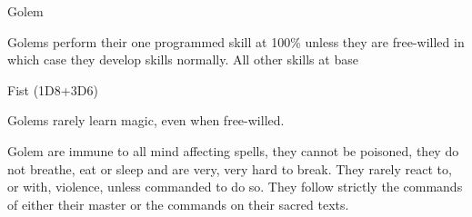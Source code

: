\begin{monsterbox}{Golem}
\begin{rpg-monsteraction}[Practical]
		Golems perform their one programmed skill at 100\% unless they are free-willed in which case they develop skills normally. All other skills at base %
	\end{rpg-monsteraction}
	\begin{rpg-monsteraction}
		Fist (1D8+3D6)
	\end{rpg-monsteraction}
	\begin{rpg-monsteraction}[Magic]
		Golems rarely learn magic, even when free-willed.
	\end{rpg-monsteraction}
	\begin{rpg-monsteraction}
		Golem are immune to all mind affecting spells, they cannot be poisoned, they do not breathe, eat or sleep and are very, very hard to break. They rarely react to, or with, violence, unless commanded to do so. They follow strictly the commands of either their master or the commands on their sacred texts.
	\end{rpg-monsteraction}

\end{monsterbox}


